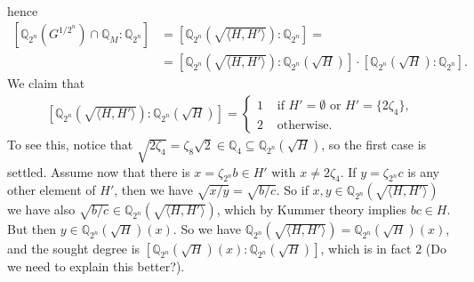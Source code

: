 \documentclass[10pt,a4paper]{article}
\theoremstyle{definition}
\begin{document}
\begin{itemize}
\begin{align*}
\end{align*}
hence
\begin{align*}
\left[\mathbb{Q}_{2^n}\left(G^{1/2^n}\right)\cap \mathbb{Q}_M:\mathbb{Q}_{2^n}\right]&=\left[\mathbb{Q}_{2^n}\left(\sqrt{\langle H, H'\rangle}\right):\mathbb{Q}_{2^n}\right]=\\
&=\left[\mathbb{Q}_{2^n}\left(\sqrt{\langle H, H'\rangle}\right):\mathbb{Q}_{2^n}\left(\sqrt{H}\right)\right]\cdot \left[\mathbb{Q}_{2^n}\left(\sqrt{H}\right):\mathbb{Q}_{2^n}\right].
\end{align*}
We claim that
\begin{align*}
\left[\mathbb{Q}_{2^n}\left(\sqrt{\langle H, H'\rangle}\right):\mathbb{Q}_{2^n}\left(\sqrt{H}\right)\right]=\begin{cases}
1&\text{ if }H'=\emptyset\text{ or }H'=\{2\zeta_4\},\\
2&\text{ otherwise}.
\end{cases}
\end{align*}
To see this, notice that $\sqrt{2\zeta_4}=\zeta_8\sqrt{2}\in\mathbb{Q}_4\subseteq\mathbb{Q}_{2^n}\left(\sqrt{H}\right)$, so the first case is settled. Assume now that there is $x=\zeta_{2^n}b\in H'$ with $x\neq 2\zeta_4$. If $y=\zeta_{2^n}c$ is any other element of $H'$, then we have $\sqrt{x/y}=\sqrt{b/c}$. So if $x,y\in \mathbb{Q}_{2^n}\left(\sqrt{\langle H, H'\rangle}\right)$ we have also $\sqrt{b/c}\in \mathbb{Q}_{2^n}\left(\sqrt{\langle H, H'\rangle}\right)$, which by Kummer theory implies $bc\in H$. But then $y\in \mathbb{Q}_{2^n}\left(\sqrt{H}\right)\left(x\right)$. So we have $\mathbb{Q}_{2^n}\left(\sqrt{\langle H, H'\rangle}\right)=\mathbb{Q}_{2^n}\left(\sqrt{H}\right)(x)$, and the sought degree is $\left[\mathbb{Q}_{2^n}\left(\sqrt{H}\right)(x):\mathbb{Q}_{2^n}\left(\sqrt{H}\right)\right]$, which is in fact $2$ ({\color{red}Do we need to explain this better?}).


\end{itemize}
\end{document}
